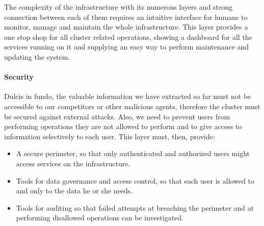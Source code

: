 The complexity of the infrastructure with its numerous layers and strong connection between each of them requires an intuitive interface for humans to monitor, manage and maintain the whole infrastructure.\newline
This layer provides a one stop shop for all cluster related operations, showing a dashboard for all the services running on it and supplying an easy way to perform maintenance and updating the system.

\paragraph{Security}

Dulcis in fundo, the valuable information we have extracted so far must not be accessible to our competitors or other malicious agents, therefore the cluster must be secured against external attacks.\newline
Also, we need to prevent users from performing operations they are not allowed to perform and to give access to information selectively to each user.
This layer must, then, provide:
\begin{itemize}
	\item A secure perimeter, so that only authenticated and authorized users might access services on the infrastructure.
	\item Tools for data governance and access control, so that each user is allowed to and only to the data he or she needs.
	\item Tools for auditing so that failed attempts at breaching the perimeter and at performing disallowed operations can be investigated.
\end{itemize}